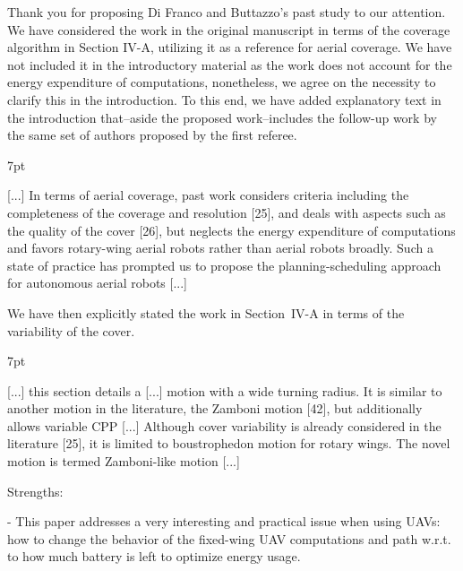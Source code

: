 \documentclass[10pt]{letter}
\newenvironment{formal}{%
  \def\FrameCommand{%
    \hspace{1pt}%
    {\color{red}\vrule width 2pt}%
    {\color{formalshade}\vrule width 4pt}%
    \colorbox{formalshade}%
  }%
  \MakeFramed{\advance\hsize-\width\FrameRestore}%
  \noindent\hspace{-4.55pt}%
  \begin{adjustwidth}{}{7pt}%
  \vspace{2pt}\vspace{2pt}%
}
{%
  \vspace{2pt}\end{adjustwidth}\endMakeFramed%
}
\begin{document}
{\color{blue} 

{\hspace*{-4.5em}{[R2:1]}\vspace*{-1.9em}}

Thank you for proposing Di Franco and Buttazzo's past study to our attention. We have considered the work in the original manuscript in terms of the coverage algorithm in Section IV-A, utilizing it as a reference for aerial coverage. We have not included it in the introductory material as the work does not account for the energy expenditure of computations, nonetheless, we agree on the necessity to clarify this in the introduction. To this end, we have added explanatory text in the introduction that--aside the proposed work--includes the follow-up work by the same set of authors proposed by the first referee.

\begin{formal}
  \color{black} [...] {\color{blue}In terms of aerial coverage, past work considers criteria including the completeness of the coverage and resolution [{\color{green}25}], and deals with aspects such as the quality of the cover [{\color{green}26}], but neglects the energy expenditure of computations and favors rotary-wing aerial robots rather than aerial robots broadly.} Such a state of practice has prompted us to propose the planning-scheduling approach for autonomous aerial robots [...]
  \vspace*{1ex}
\end{formal}

We have then explicitly stated the work in Section~IV-A
in terms of the variability of the cover.

\begin{formal}
  \color{black} [...] this section details a [...] motion with a wide turning radius. It is similar to another motion in the literature, the Zamboni
  motion [{\color{green}42}], but additionally allows variable CPP [...] {\color{blue} Although cover variability is already considered in the literature [{\color{green}25}], it is limited to boustrophedon motion for rotary wings.} The novel motion is termed Zamboni-like motion [...]
  \vspace*{1ex}
\end{formal}

}

\vspace{2em}

Strengths:

- This paper addresses a very interesting and practical issue when using UAVs: how to change the behavior of the fixed-wing UAV computations and path w.r.t. to how much battery is left to optimize energy usage.
\end{document}
